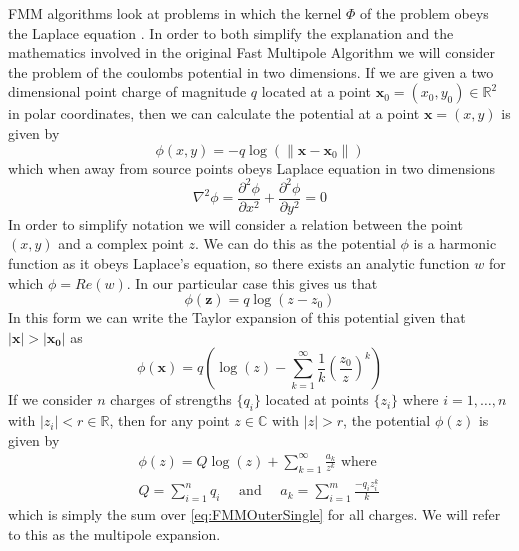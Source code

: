 FMM algorithms look at problems in which the kernel $\Phi$ of the problem obeys the Laplace equation \cite{Beatson}. In order to both simplify the explanation and the mathematics involved in the original Fast Multipole Algorithm \cite{Greengard1987ASimulations} we will consider the problem of the coulombs potential in two dimensions. If we are given a two dimensional point charge of magnitude $q$ located at a point $\bm{x}_0 = (x_0,y_0) \in \mathbb{R}^2$ in polar coordinates, then we can calculate the potential at a point $\bm{x} = (x,y)$ is given by
\begin{equation*}
    \phi(x,y) = -q\log(\lVert \bm{x} - \bm{x}_0 \rVert)
\end{equation*}
which when away from source points obeys Laplace equation in two dimensions
\begin{equation*}
    \nabla^2 \phi = \frac{\partial^2 \phi}{\partial x^2} + \frac{\partial^2 \phi}{\partial y^2} = 0
\end{equation*}
In order to simplify notation we will consider a relation between the point $(x,y)$ and a complex point $z$. We can do this as the potential $\phi$ is a harmonic function as it obeys Laplace's equation, so there exists an analytic function $w$ for which $\phi = Re(w)$. In our particular case this gives us that 
\begin{equation*}
    \phi(\bm{z}) = q\log(z-z_0)
\end{equation*}
In this form we can write the Taylor expansion of this potential given that $|\bm{x}|>|\bm{x_0}|$ as 
\begin{equation}
\label{eq:FMMOuterSingle}
    \phi(\bm{x}) = q\left( \log(z) - \sum_{k=1}^{\infty} \frac{1}{k}\left( \frac{z_0}{z} \right)^k \right)
\end{equation}
If we consider $n$ charges of strengths $\{q_i\}$ located at points $\{z_i\}$ where $i=1,\dots,n$ with $|z_i|<r\in\mathbb{R}$, then for any point $z\in\mathbb{C}$ with $|z|>r$, the potential $\phi(z)$ is given by
\begin{equation}
\label{eq:FMMOuterMulti}
\begin{gathered}
    \phi(z) = Q\log(z) + \sum_{k=1}^\infty \frac{a_k}{z^k} \text{ where }\\
    Q = \sum_{i=1}^n q_i \quad \text{ and } \quad a_k = \sum_{i=1}^{m} \frac{-q_i z_i^k}{k}
\end{gathered}
\end{equation}
which is simply the sum over \cref{eq:FMMOuterSingle} for all charges. We will refer to this as the multipole expansion. 
